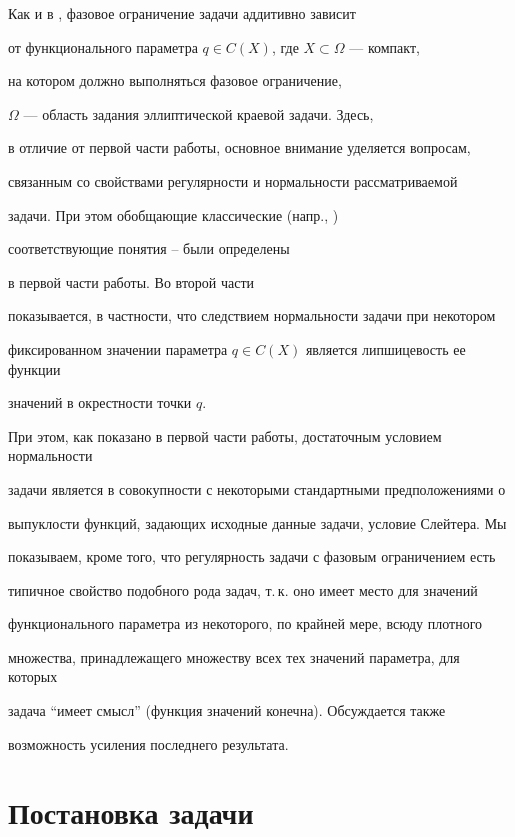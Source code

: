 Как и в \cite{sumin98}, фазовое ограничение задачи аддитивно зависит


от функционального параметра $q\in C(X)$, где $X\subset\Omega$ --- компакт,


на котором должно выполняться фазовое ограничение,


$\Omega$ --- область задания эллиптической краевой задачи. Здесь,


в отличие от первой части работы, основное внимание уделяется вопросам,


связанным со свойствами регулярности и нормальности рассматриваемой


задачи. При этом обобщающие классические (напр., \cite{warga})


соответствующие понятия \cite{sumin95}--\cite{sumin97b} были определены


в первой части работы. Во второй части


показывается, в частности, что следствием нормальности задачи при некотором


фиксированном значении параметра $q\in C(X)$ является липшицевость ее функции


значений в окрестности точки $q$.


При этом, как показано в первой части работы, достаточным условием нормальности


задачи является в совокупности с некоторыми стандартными предположениями о


выпуклости функций, задающих исходные данные задачи, условие Слейтера. Мы


показываем, кроме того, что регулярность задачи с фазовым ограничением есть


типичное свойство подобного рода задач, т.\,к. оно имеет место для значений


функционального параметра из некоторого, по крайней мере, всюду плотного


множества, принадлежащего множеству всех тех значений параметра, для которых


задача ``имеет смысл'' (функция значений конечна). Обсуждается также


возможность усиления последнего результата.





\section{Постановка задачи}





